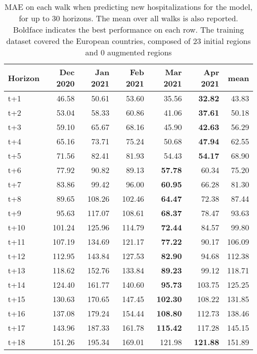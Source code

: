 \begin{table}[H]
\centering
\caption{MAE on each walk when predicting new hospitalizations for the model, for up to 30 horizons. The mean over all walks is also reported. Boldface indicates the best performance on each row. The training dataset covered the European countries, composed of 23 initial regions and 0 augmented regions }
\label{tab:MAE_walk_assembly_1}
\begin{tabular}{lrrrrrr}
\toprule
Horizon &  Dec 2020 &  Jan 2021 &  Feb 2021 &  Mar 2021 &  Apr 2021 &   mean \\
\midrule
t+1  & 46.58  & 50.61  & 53.60  & 35.56  & \textbf{32.82}  & 43.83  \\
t+2  & 53.04  & 58.33  & 60.86  & 41.06  & \textbf{37.61}  & 50.18  \\
t+3  & 59.10  & 65.67  & 68.16  & 45.90  & \textbf{42.63}  & 56.29  \\
t+4  & 65.16  & 73.71  & 75.24  & 50.68  & \textbf{47.94}  & 62.55  \\
t+5  & 71.56  & 82.41  & 81.93  & 54.43  & \textbf{54.17}  & 68.90  \\
t+6  & 77.92  & 90.82  & 89.13  & \textbf{57.78}  & 60.34  & 75.20  \\
t+7  & 83.86  & 99.42  & 96.00  & \textbf{60.95}  & 66.28  & 81.30  \\
t+8  & 89.65  & 108.26  & 102.46  & \textbf{64.47}  & 72.38  & 87.44  \\
t+9  & 95.63  & 117.07  & 108.61  & \textbf{68.37}  & 78.47  & 93.63  \\
t+10  & 101.24  & 125.96  & 114.79  & \textbf{72.44}  & 84.57  & 99.80  \\
t+11  & 107.19  & 134.69  & 121.17  & \textbf{77.22}  & 90.17  & 106.09  \\
t+12  & 112.95  & 143.84  & 127.53  & \textbf{82.90}  & 94.68  & 112.38  \\
t+13  & 118.62  & 152.76  & 133.84  & \textbf{89.23}  & 99.12  & 118.71  \\
t+14  & 124.40  & 161.77  & 140.60  & \textbf{95.73}  & 103.75  & 125.25  \\
t+15  & 130.63  & 170.65  & 147.45  & \textbf{102.30}  & 108.22  & 131.85  \\
t+16  & 137.08  & 179.24  & 154.44  & \textbf{108.80}  & 112.73  & 138.46  \\
t+17  & 143.96  & 187.33  & 161.78  & \textbf{115.42}  & 117.28  & 145.15  \\
t+18  & 151.26  & 195.34  & 169.01  & 121.98  & \textbf{121.88}  & 151.89  \\

\end{tabular}
\end{table}

